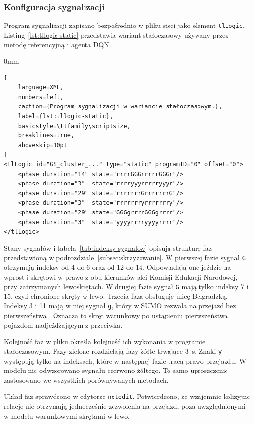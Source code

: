 \subsubsection{Konfiguracja sygnalizacji}
\label{subsubsec:konfiguracja-sygnalizacji}

Program sygnalizacji zapisano bezpośrednio w pliku sieci jako element \texttt{tlLogic}. Listing~\ref{lst:tllogic-static} przedstawia wariant stałoczasowy używany przez metodę referencyjną i agenta DQN.

\begin{addmargin}[8mm]{0mm}
\begin{lstlisting}[
    language=XML,
    numbers=left,
    caption={Program sygnalizacji w wariancie stałoczasowym.},
    label={lst:tllogic-static},
    basicstyle=\ttfamily\scriptsize,
    breaklines=true,
    aboveskip=10pt
]
<tlLogic id="GS_cluster_..." type="static" programID="0" offset="0">
    <phase duration="14" state="rrrrGGGrrrrrGGGr"/>
    <phase duration="3"  state="rrrryyyrrrrryyyr"/>
    <phase duration="29" state="rrrrrrrGrrrrrrrG"/>
    <phase duration="3"  state="rrrrrrryrrrrrrry"/>
    <phase duration="29" state="GGGgrrrrGGGgrrrr"/>
    <phase duration="3"  state="yyyyrrrryyyyrrrr"/>
</tlLogic>
\end{lstlisting}
\end{addmargin}

Stany sygnałów i tabela~\ref{tab:indeksy-sygnalow} opisują strukturę faz przedstawioną w podrozdziale~\ref{subsec:skrzyzowanie}. W pierwszej fazie sygnał \texttt{G} otrzymują indeksy od 4 do 6 oraz od 12 do 14. Odpowiadają one jeździe na wprost i skrętowi w prawo z obu kierunków alei Komisji Edukacji Narodowej, przy zatrzymanych lewoskrętach. W drugiej fazie sygnał \texttt{G} mają tylko indeksy 7 i 15, czyli chronione skręty w lewo. Trzecia faza obsługuje ulicę Belgradzką. Indeksy 3 i 11 mają w niej sygnał \texttt{g}, który w SUMO zezwala na przejazd bez pierwszeństwa \cite{sumoTrafficLights}. Oznacza to skręt warunkowy po ustąpieniu pierwszeństwa pojazdom nadjeżdżającym z przeciwka.

Kolejność faz w pliku określa kolejność ich wykonania w programie stałoczasowym. Fazy zielone rozdzielają fazy żółte trwające 3~s. Znaki \texttt{y} występują tylko na indeksach, które w następnej fazie tracą prawo przejazdu. W modelu nie odwzorowano sygnału czerwono-żółtego. To samo uproszczenie zastosowano we wszystkich porównywanych metodach.

Układ faz sprawdzono w edytorze \texttt{netedit}. Potwierdzono, że wzajemnie kolizyjne relacje nie otrzymują jednocześnie zezwolenia na przejazd, poza uwzględnionymi w modelu warunkowymi skrętami w lewo.

